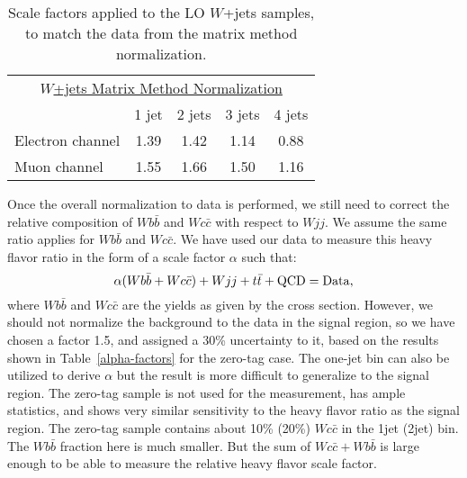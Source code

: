 \vspace{0.05in}
\begin{table}[!h!tbp]
\begin{center}
\begin{minipage}{3.5 in}
\begin{ruledtabular}
\begin{tabular}{l||cccc}
\multicolumn{5}{c}{\hspace{0.4in}\underline{$W$+jets Matrix Method Normalization}}\vspace{0.1in} \\
                 &  1 jet  &  2 jets &  3 jets &  4 jets  \\
\hline
Electron channel &   1.39  &   1.42  &   1.14  &   0.88   \\
Muon channel     &   1.55  &   1.66  &   1.50  &   1.16
\end{tabular}
\end{ruledtabular}
\vspace{-0.1 in}
\caption[mmwjetsfactors]{Scale factors applied to the LO $W$+jets
samples, to match the data from the matrix method normalization.}
\label{mmwjets-factors}
\end{minipage}
\end{center}
\end{table}

Once the overall normalization to data is performed, we still need to
correct the relative composition of $Wb\bar{b}$ and $Wc\bar{c}$ with
respect to $Wjj$. We assume the same ratio applies for $Wb\bar{b}$ and
$Wc\bar{c}$. We have used our data to measure this heavy flavor ratio
in the form of a scale factor $\alpha$ such that:
$$
\alpha(Wb\bar{b}+Wc\bar{c})+Wjj+\mbox{$t\bar{t}$}+{\rm QCD = Data,}
$$ where $Wb\bar{b}$ and $Wc\bar{c}$ are the yields as given by the
{\alpgen} cross section. However, we should not normalize the
background to the data in the signal region, so we have chosen a
factor 1.5, and assigned a 30\% uncertainty to it, based on the
results shown in Table~\ref{alpha-factors} for the zero-tag case. The
one-jet bin can also be utilized to derive $\alpha$ but the result is
more difficult to generalize to the signal region. The zero-tag sample
is not used for the measurement, has ample statistics, and shows very
similar sensitivity to the heavy flavor ratio as the signal
region. The zero-tag sample contains about 10\% (20\%) $Wc\bar{c}$ in
the 1jet (2jet) bin. The $Wb\bar{b}$ fraction here is much
smaller. But the sum of $Wc\bar{c} + Wb\bar{b}$ is large enough to be
able to measure the relative heavy flavor scale factor.

